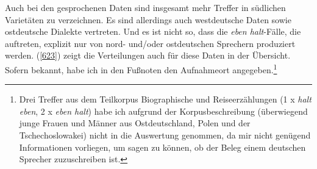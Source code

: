 Auch bei den gesprochenen Daten sind insgesamt mehr Treffer in südlichen Varietäten zu verzeichnen. Es sind allerdings auch westdeutsche Daten sowie ostdeutsche Dialekte vertreten. Und es ist nicht so, dass die \textit{eben halt}-Fälle, die auftreten, explizit nur von nord- und/oder ostdeutschen Sprechern produziert werden. (\ref{623}) zeigt die Verteilungen auch für diese Daten in der Übersicht. Sofern bekannt, habe ich in den Fußnoten den Aufnahmeort angegeben.\footnote{Drei Treffer aus dem Teilkorpus \glqq Biographische und Reiseerzählungen\grqq{} (1 x \textit{halt eben}, 2 x \textit{eben halt}) habe ich aufgrund der Korpusbeschreibung (\glqq überwiegend junge Frauen und Männer aus Ostdeutschland, Polen und der Tschechoslowakei\grqq{}) nicht in die Auswertung genommen, da mir nicht genügend Informationen vorliegen, um sagen zu können, ob der Beleg einem deutschen Sprecher zuzuschreiben ist.}

